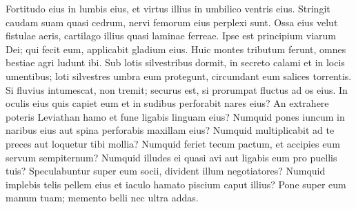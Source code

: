 \begin{biblechapter}
\begin{biblechapter}
\begin{biblechapter}
\begin{biblechapter}
\begin{biblechapter}
\begin{biblechapter}
\begin{biblechapter}
\begin{biblechapter}
\begin{biblechapter}
\begin{biblechapter}
\begin{biblechapter}
\begin{biblechapter}
\begin{biblechapter}
\begin{biblechapter}
\begin{biblechapter}
\begin{biblechapter}
\begin{biblechapter}
\begin{biblechapter}
\begin{biblechapter}
\begin{biblechapter}
\begin{biblechapter}
\begin{biblechapter}
\begin{biblechapter}
\begin{biblechapter}
\begin{biblechapter}
\begin{biblechapter}
\begin{biblechapter}
\begin{biblechapter}
\begin{biblechapter}
\begin{biblechapter}
\begin{biblechapter}
\begin{biblechapter}
\begin{biblechapter}
\begin{biblechapter}
\begin{biblechapter}
\begin{biblechapter}
\begin{biblechapter}
\begin{biblechapter}
\begin{biblechapter}
\begin{biblechapter}
 \verse Fortitudo eius in lumbis eius,
 et virtus illius in umbilico ventris eius.
 \verse Stringit caudam suam quasi cedrum,
 nervi femorum eius perplexi sunt.
 \verse Ossa eius velut fistulae aeris,
 cartilago illius quasi laminae ferreae.
 \verse Ipse est principium viarum Dei;
 qui fecit eum, applicabit gladium eius.
 \verse Huic montes tributum ferunt,
 omnes bestiae agri ludunt ibi.
 \verse Sub lotis silvestribus dormit,
 in secreto calami et in locis umentibus;
 \verse loti silvestres umbra eum protegunt,
 circumdant eum salices torrentis.
 \verse Si fluvius intumescat, non tremit;
 securus est, si prorumpat fluctus ad os eius.
 \verse In oculis eius quis capiet eum
 et in sudibus perforabit nares eius?
 \verse An extrahere poteris Leviathan hamo
 et fune ligabis linguam eius?
 \verse Numquid pones iuncum in naribus eius
 aut spina perforabis maxillam eius? 
\verse Numquid multiplicabit ad te preces
 aut loquetur tibi mollia?
 \verse Numquid feriet tecum pactum,
 et accipies eum servum sempiternum?
 \verse Numquid illudes ei quasi avi
 aut ligabis eum pro puellis tuis?
 \verse Speculabuntur super eum socii,
 divident illum negotiatores?
 \verse Numquid implebis telis pellem eius
 et iaculo hamato piscium caput illius?
 \verse Pone super eum manum tuam;
 memento belli nec ultra addas.
 

\end{biblechapter}
\end{biblechapter}
\end{biblechapter}
\end{biblechapter}
\end{biblechapter}
\end{biblechapter}
\end{biblechapter}
\end{biblechapter}
\end{biblechapter}
\end{biblechapter}
\end{biblechapter}
\end{biblechapter}
\end{biblechapter}
\end{biblechapter}
\end{biblechapter}
\end{biblechapter}
\end{biblechapter}
\end{biblechapter}
\end{biblechapter}
\end{biblechapter}
\end{biblechapter}
\end{biblechapter}
\end{biblechapter}
\end{biblechapter}
\end{biblechapter}
\end{biblechapter}
\end{biblechapter}
\end{biblechapter}
\end{biblechapter}
\end{biblechapter}
\end{biblechapter}
\end{biblechapter}
\end{biblechapter}
\end{biblechapter}
\end{biblechapter}
\end{biblechapter}
\end{biblechapter}
\end{biblechapter}
\end{biblechapter}
\end{biblechapter}
